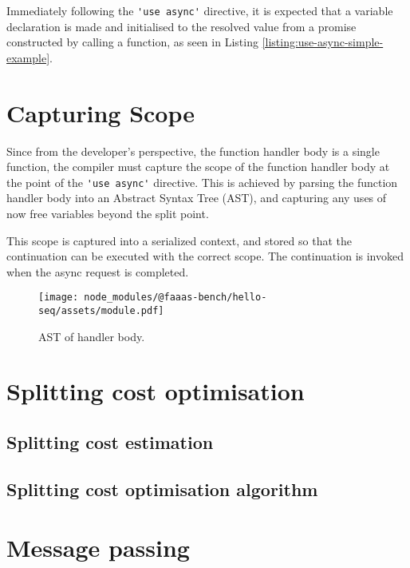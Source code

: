 Immediately following the \verb|'use async'| directive, it is expected that a variable declaration is made and initialised to the resolved value from a promise constructed by calling a function, as seen in Listing \ref{listing:use-async-simple-example}.

\section{Capturing Scope}

Since from the developer's perspective, the function handler body is a single function, the \faaasc{} compiler must capture the scope of the function handler body at the point of the \verb|'use async'| directive. This is achieved by parsing the function handler body into an Abstract Syntax Tree (AST), and capturing any uses of now free variables beyond the split point.

This scope is captured into a serialized context, and stored so that the continuation can be executed with the correct scope. The continuation is invoked when the async request is completed.

\begin{figure}[t]
    \texttt{[image: node\_modules/@faaas-bench/hello-seq/assets/module.pdf]}
    \caption{AST of handler body.}
    \label{fig:suites-hello-seq-module-ast}
\end{figure}

\section{Splitting cost optimisation}

\subsection{Splitting cost estimation}

\subsection{Splitting cost optimisation algorithm}

\section{Message passing}

